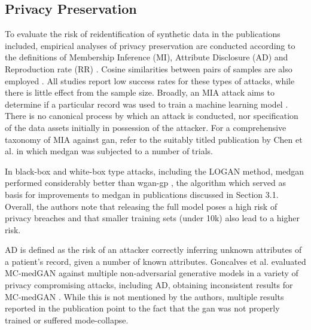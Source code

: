 \subsection{Privacy Preservation}
To evaluate the risk of reidentification of synthetic data in the publications included, empirical analyses of privacy preservation are conducted according to the definitions of Membership Inference (MI), Attribute Disclosure (AD)  \cite{Choi2017-nt,Goncalves2020,yan2020generating} and Reproduction rate (RR) \cite{Zhang2020}. Cosine similarities between pairs of samples are also employed \cite{torfi2019generating}. All studies report low success rates for these types of attacks, while there is little effect from the sample size. Broadly, an MIA attack aims to determine if a particular record was used to train a machine learning model \cite{chen2019ganleaks}. There is no canonical process by which an attack is conducted, nor specification of the data assets initially in possession of the attacker. For a comprehensive taxonomy of MIA against \gls{gan}, refer to the suitably titled publication by Chen et al. in which \gls{medgan} was subjected to a number of trials.\par
In black-box and white-box type attacks, including the LOGAN \cite{hayes2017logan} method, \gls{medgan} performed considerably better than \gls{wgan-gp} \cite{gulrajani2017improved}, the algorithm which served as basis for improvements to \gls{medgan} in publications discussed in Section 3.1. Overall, the authors note that releasing the full model poses a high risk of privacy breaches and that smaller training sets (under 10k) also lead to a higher risk.\par  
AD is defined as the risk of an attacker correctly inferring unknown attributes of a patient's record, given a number of known attributes. Goncalves et al. evaluated MC-medGAN against multiple non-adversarial generative models in a variety of privacy compromising attacks, including AD, obtaining inconsistent results for MC-medGAN \cite{Goncalves2020}. While this is not mentioned by the authors, multiple results reported in the publication point to the fact that the \gls{gan} was not properly trained or suffered mode-collapse.\par

